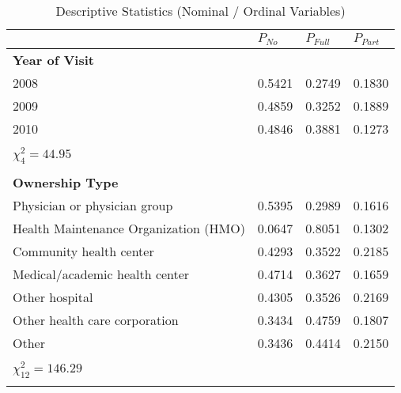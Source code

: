 \begin{table}[h]
\footnotesize 
\centering
\caption{Descriptive Statistics (Nominal / Ordinal Variables)}

\label{tab:desc1}

\begin{tabular}{@{}llll@{}}
\toprule
                                       & $P_{No}$ & $P_{Full}$ & $P_{Part}$ \\ \midrule
\textbf{Year of Visit}                 &          &            &            \\
2008                                   & 0.5421   & 0.2749     & 0.1830     \\
2009                                   & 0.4859   & 0.3252     & 0.1889     \\
2010                                   & 0.4846   & 0.3881     & 0.1273     \\
                                       &          &            &            \\
$\chi^2_4 = 44.95$                     &          &            &            \\
                                       &          &            &            \\
\textbf{Ownership Type}                &          &            &            \\
Physician or physician group           & 0.5395   & 0.2989     & 0.1616     \\
Health Maintenance Organization (HMO)  & 0.0647   & 0.8051     & 0.1302     \\
Community health center                & 0.4293   & 0.3522     & 0.2185     \\
Medical/academic health center         & 0.4714   & 0.3627     & 0.1659     \\
Other hospital                         & 0.4305   & 0.3526     & 0.2169     \\
Other health care corporation          & 0.3434   & 0.4759     & 0.1807     \\
Other                                  & 0.3436   & 0.4414     & 0.2150     \\
                                       &          &            &            \\
$\chi^2_{12} = 146.29$                 &          &            &            \\
                                       &          &            &            \\

\end{tabular}
\end{table}
